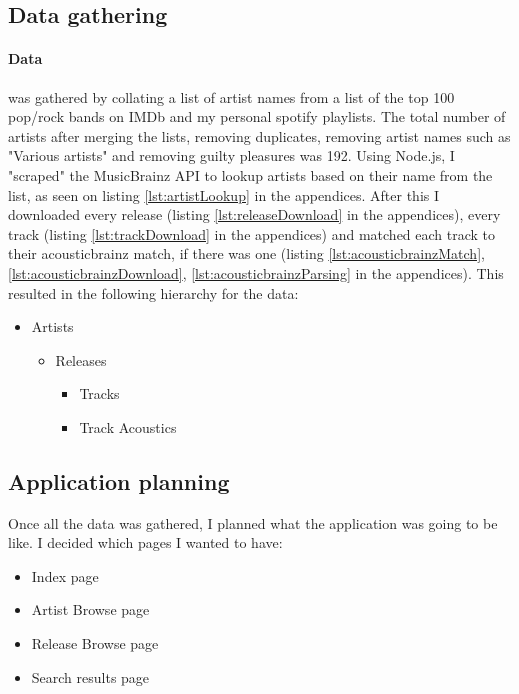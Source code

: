 \documentclass[10pt, a4paper]{article}
\begin{document}
	\subsection{Data gathering}
	\paragraph{Data} was gathered by collating a list of artist names from a list of the top 100 pop/rock bands on IMDb \cite{The 100 Greatest Pop/Rock Bands} and my personal spotify playlists.
	The total number of artists after merging the lists, removing duplicates, removing artist names such as "Various artists" and removing guilty pleasures was 192.
	Using Node.js\cite{Node js Foundation}, I "scraped" the MusicBrainz API to lookup artists based on their name from the list, as seen on listing \ref{lst:artistLookup} in the appendices.
	After this I downloaded every release (listing \ref{lst:releaseDownload} in the appendices), every track (listing \ref{lst:trackDownload} in the appendices) and matched each track to their acousticbrainz match, if there was one (listing \ref{lst:acousticbrainzMatch}, \ref{lst:acousticbrainzDownload}, \ref{lst:acousticbrainzParsing} in the appendices).
	This resulted in the following hierarchy for the data:
	\begin{itemize}
	\item Artists
		\begin{itemize}
		\item Releases
			\begin{itemize}
			\item Tracks
			\item Track Acoustics
			\end{itemize}
		\end{itemize}
	\end{itemize}
    
    
	\subsection{Application planning}
	Once all the data was gathered, I planned what the application was going to be like. I decided which pages I wanted to have:

	\begin{itemize}
	\item Index page
	\item Artist Browse page
	\item Release Browse page
	\item Search results page
	\end{itemize}
    
\end{document}
